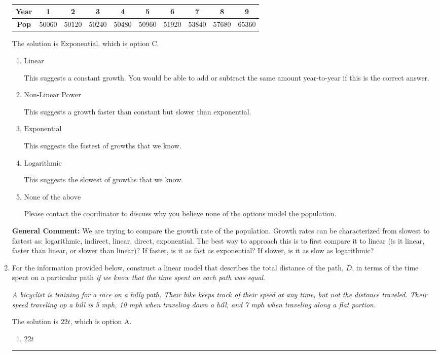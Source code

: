 \documentclass{extbook}[14pt]
\newcommand{\litem}[1]{\item #1

\rule{\textwidth}{0.4pt}}
\begin{document}
\begin{enumerate}
{\begin{tabular}{c|c|c|c|c|c|c|c|c|c}
\textbf{Year} &1 &2 &3 &4 &5 &6 &7 &8 &9\tabularnewline \hline
\textbf{Pop} &50060 &50120 &50240 &50480 &50960 &51920 &53840 &57680 &65360\end{tabular}The solution is \( \text{Exponential} \), which is option C.\begin{enumerate}[label=\Alph*.]
\item \( \text{Linear} \)

This suggests a constant growth. You would be able to add or subtract the same amount year-to-year if this is the correct answer.
\item \( \text{Non-Linear Power} \)

This suggests a growth faster than constant but slower than exponential.
\item \( \text{Exponential} \)

This suggests the fastest of growths that we know.
\item \( \text{Logarithmic} \)

This suggests the slowest of growths that we know.
\item \( \text{None of the above} \)

Please contact the coordinator to discuss why you believe none of the options model the population.
\end{enumerate}

\textbf{General Comment:} We are trying to compare the growth rate of the population. Growth rates can be characterized from slowest to fastest as: logarithmic, indirect, linear, direct, exponential. The best way to approach this is to first compare it to linear (is it linear, faster than linear, or slower than linear)? If faster, is it as fast as exponential? If slower, is it as slow as logarithmic?
}
\litem{
For the information provided below, construct a linear model that describes the total distance of the path, $D$, in terms of the time spent on a particular path \textit{if we know that the time spent on each path was equal}.

\begin{center}
    \textit{ A bicyclist is training for a race on a hilly path. Their bike keeps track of their speed at any time, but not the distance traveled. Their speed traveling up a hill is 5 mph, 10 mph when traveling down a hill, and 7 mph when traveling along a flat portion. }
\end{center}
The solution is \( 22 t \), which is option A.\begin{enumerate}[label=\Alph*.]
\item \( 22 t \)


\end{enumerate}}
\end{enumerate}
\end{document}
